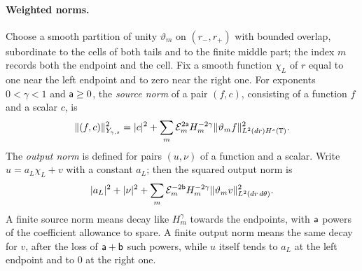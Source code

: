 \paragraph{Weighted norms.}
Choose a smooth partition of unity $\vartheta_m$ on $(r_-,r_+)$ with
bounded overlap, subordinate to the cells of both tails and to the
finite middle part; the index $m$ records both the endpoint and the
cell. Fix a smooth function $\chi_L$ of $r$ equal to one near the left
endpoint and to zero near the right one. For exponents $0<\gamma<1$
and $\mathsf a\ge0$, the \emph{source norm} of a pair $(f,c)$, consisting of
a function $f$ and a scalar $c$, is
\begin{equation}\label{eq:rad-eq-source-norm}
 \|(f,c)\|_{Y_{\gamma,s}}^2
 =|c|^2+\sum_m\mathcal E_m^{2\mathsf a}H_m^{-2\gamma}
       \|\vartheta_m f\|_{L^2(dr)H^s(\mathbb T)}^2 .
\end{equation}
The \emph{output norm} is defined for pairs $(u,\nu)$ of a function
and a scalar. Write $u=a_L\chi_L+v$ with a constant $a_L$; then the
squared output norm is
\[
 |a_L|^2+|\nu|^2+\sum_m\mathcal E_m^{-2\mathsf b}H_m^{-2\gamma}
       \|\vartheta_m v\|_{L^2(dr\,d\theta)}^2 .
\]
A finite source norm means decay like $H_m^{\gamma}$ towards the
endpoints, with $\mathsf a$ powers of the coefficient allowance to spare. A
finite output norm means the same decay for $v$, after the loss of
$\mathsf a+\mathsf b$ such powers, while $u$ itself tends to $a_L$ at the left
endpoint and to $0$ at the right one.

